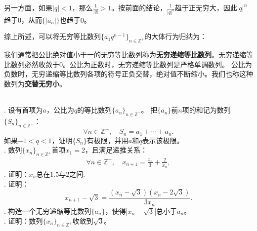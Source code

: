 \documentclass[12pt,UTF8]{ctexbook}
\begin{document}

另一方面，如果$|q| < 1$，那么$\displaystyle\frac{1}{|q|} > 1$。按前面的结论，$\frac{1}{|q|^n}$趋于正无穷大，因此$|q|^n$趋于$0$，从而$\{|a_n|\}$也趋于$0$。

综上所述，可以将无穷等比数列$\{a_1 q^{n-1}\}_{n\in\mathbb{Z}^+}$的大体行为归纳为：

\begin{center}
\end{center}

我们通常把公比绝对值小于一的无穷等比数列称为\textbf{无穷递缩等比数列}。无穷递缩等比数列必然收敛于$0$。公比为正数时，无穷递缩等比数列是严格单调数列。
公比为负数时，无穷递缩等比数列各项的符号正负交替，绝对值不断缩小。我们也称这种数列为\textbf{交替无穷小}。

\begin{xt}
    \mbox{}\\
    . 设有首项为$a$，公比为$q$的等比数列$\{a_n\}_{n\in\mathbb{Z}^+}$。
    把$\{a_n\}$前$n$项的和记为数列$\{S_n\}_{n\in\mathbb{Z}^+}$：
    $$ \forall n \in \mathbb{Z}^+ , \quad S_n = a_1 + \cdots + a_n. $$
    如果$-1<q<1$，证明$\{S_n\}$有极限，并用$a$和$q$表示该极限。\\
    . 数列$\{x_n\}_{n\in\mathbb{Z}^+}$首项$ x_1 = 2$，且满足递推关系：
    \begin{align*}
        \forall n\in\mathbb{Z}^+, \quad x_{n+1} = \frac{x_n}{3} + \frac{2}{x_n},
    \end{align*}
    . 证明：$x_n$总在$1.5$与$2$之间.\\
    . 证明：
    $$x_{n+1} - \sqrt{3} = \frac{(x_n - \sqrt{3})(x_n - 2\sqrt{3})}{3x_n}.$$
    . 构造一个无穷递缩等比数列$\{a_n\}$，使得$|x_n - \sqrt{3}|$总小于$a_n$。\\
    . 证明：数列$\{x_n\}_{n\in\mathbb{Z}^+}$收敛到$\sqrt{3}$。
\end{xt}
\end{document}
